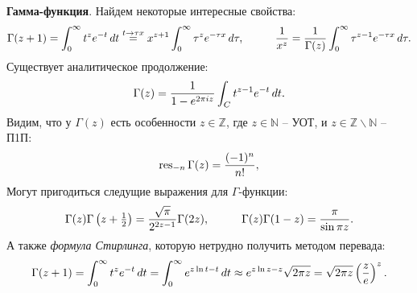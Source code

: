 
\textbf{Гамма-функция}.
Найдем некоторые интересные свойства:
\begin{equation*}
    \Gamma(z+1) = \int_{0}^{\infty} t^{z} e^{-t} \d t \overset{t \to \tau x}{=} 
    x^{z+1} \int_{0}^{\infty} \tau^{z} e^{- \tau x} \d \tau,
    \hspace{10 mm} 
    \frac{1}{x^z} = \frac{1}{\Gamma(z)} \int_{0}^{\infty} \tau^{z-1} e^{- \tau x} \d \tau.
\end{equation*}
Существует аналитическое продолжение:
\begin{equation*}
    \Gamma(z) = \frac{1}{1-e^{2 \pi i z}} \int_C t^{z-1} e^{-t} \, d t.
\end{equation*}
Видим, что у $\Gamma(z)$ есть особенности $z \in \mathbb{Z}$, где $z \in \mathbb{N}$ -- УОТ, и $z \in \mathbb{Z}\backslash \mathbb{N}$ -- П1П:
\begin{equation}
    \mathop{\mathrm{res}}\nolimits_{-n} \Gamma(z) = \frac{(-1)^n}{n!},
\end{equation}
Могут пригодиться следущие выражения для $\Gamma$-функции:
\begin{equation*}
    \Gamma(z) \Gamma\left(z + \tfrac{1}{2}\right) = \frac{\sqrt{\pi}}{2^{2z-1}} \Gamma(2 z),
    \hspace{10 mm} 
    \Gamma(z) \Gamma(1-z) = \frac{\pi}{\sin \pi z}.
\end{equation*}
А также \textit{формула Стирлинга}, которую нетрудно получить методом перевада:
\begin{equation}
    \Gamma(z+1) = \int_{0}^{\infty}  t^{z} e^{-t} \, d t  = \int_0^\infty 
    e^{z \ln t - t} \, d t \approx e^{z \ln z - z} \sqrt{2 \pi z} = \sqrt{2 \pi z} \left(\frac{z}{e}\right)^{z}.
\end{equation}


